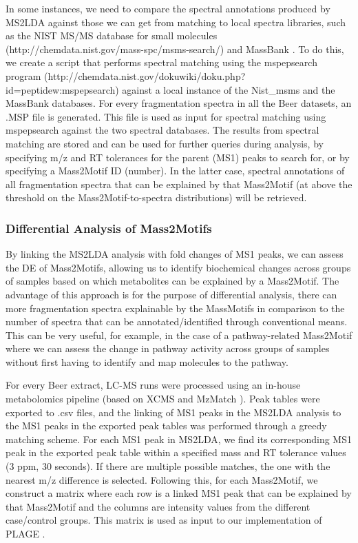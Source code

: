 In some instances, we need to compare the spectral annotations produced by MS2LDA against those we can get from matching to local spectra libraries, such as the NIST MS/MS database for small molecules (http://chemdata.nist.gov/mass-spc/msms-search/) and MassBank \cite{horai2010massbank}. To do this, we create a script that performs spectral matching using the mspepsearch program (http://chemdata.nist.gov/dokuwiki/doku.php?id=peptidew:mspepsearch) against a local instance of the Nist_msms and the MassBank databases. For every fragmentation spectra in all the Beer datasets, an .MSP file is generated. This file is used as input for spectral matching using mspepsearch against the two spectral databases. The results from spectral matching are stored and can be used for further queries during analysis, by specifying m/z and RT tolerances for the parent (MS1) peaks to search for, or by specifying a Mass2Motif ID (number). In the latter case, spectral annotations of all fragmentation spectra that can be explained by that Mass2Motif (at above the threshold on the Mass2Motif-to-spectra distributions) will be retrieved. 

\subsubsection{Differential Analysis of Mass2Motifs}

By linking the MS2LDA analysis with fold changes of MS1 peaks, we can assess the DE of Mass2Motifs, allowing us to identify biochemical changes across groups of samples based on which metabolites can be explained by a Mass2Motif. The advantage of this approach is for the purpose of differential analysis, there can more fragmentation spectra explainable by the MassMotifs in comparison to the number of spectra that can be annotated/identified through conventional means. This can be very useful, for example, in the case of a pathway-related Mass2Motif where we can assess the change in pathway activity across groups of samples without first having to identify and map molecules to the pathway.

For every Beer extract, LC-MS runs were processed using an in-house metabolomics pipeline (based on XCMS \cite{Smith2006} and MzMatch \cite{Scheltema2011}). Peak tables were exported to .csv files, and the linking of MS1 peaks in the MS2LDA analysis to the MS1 peaks in the exported peak tables was performed through a greedy matching scheme. For each MS1 peak in MS2LDA, we find its corresponding MS1 peak in the exported peak table within a specified mass and RT tolerance values (3 ppm, 30 seconds). If there are multiple possible matches, the one with the nearest m/z difference is selected. Following this, for each Mass2Motif, we construct a matrix where each row is a linked MS1 peak that can be explained by that Mass2Motif and the columns are intensity values from the different case/control groups. This matrix is used as input to our implementation of PLAGE \cite{tomfohr2005pathway}.

